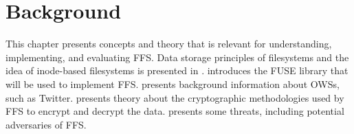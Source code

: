 \chapter{Background}

\label{ch:background}






This chapter presents concepts and theory that is relevant for understanding, implementing, and evaluating \gls{FFS}. Data storage principles of filesystems and the idea of \mbox{inode-based} filesystems is presented in .  introduces the \gls{FUSE} library that will be used to implement \gls{FFS}.  presents background information about \glspl{OWS}, such as Twitter.  presents theory about the cryptographic methodologies used by \gls{FFS} to encrypt and decrypt the data.  presents some threats, including potential adversaries of \gls{FFS}. 









